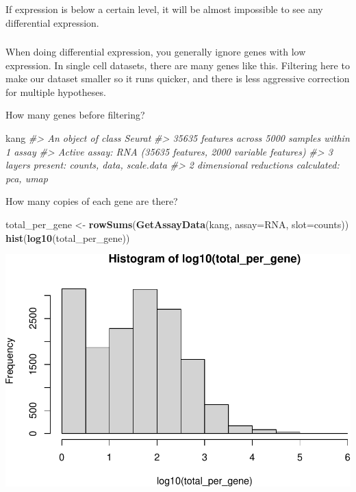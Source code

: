 \documentclass[
]{book}
\newenvironment{Shaded}{\begin{snugshade}}{\end{snugshade}}
\newcommand{\AttributeTok}[1]{\textcolor[rgb]{0.13,0.29,0.53}{#1}}
\newcommand{\CommentTok}[1]{\textcolor[rgb]{0.56,0.35,0.01}{\textit{#1}}}
\newcommand{\FunctionTok}[1]{\textcolor[rgb]{0.13,0.29,0.53}{\textbf{#1}}}
\newcommand{\NormalTok}[1]{#1}
\newcommand{\OtherTok}[1]{\textcolor[rgb]{0.56,0.35,0.01}{#1}}
\newcommand{\StringTok}[1]{\textcolor[rgb]{0.31,0.60,0.02}{#1}}
\begin{document}
If expression is below a certain level, it will be almost impossible to see any differential expression.

\hypertarget{section-11}{%
\subsubsection*{}\label{section-11}}

When doing differential expression, you generally ignore genes with low expression.
In single cell datasets, there are many genes like this. Filtering here to make our dataset smaller so it runs quicker, and there is less aggressive correction for multiple hypotheses.

How many genes before filtering?

\begin{Shaded}
\begin{Highlighting}[]
\NormalTok{kang}
\CommentTok{\#\textgreater{} An object of class Seurat }
\CommentTok{\#\textgreater{} 35635 features across 5000 samples within 1 assay }
\CommentTok{\#\textgreater{} Active assay: RNA (35635 features, 2000 variable features)}
\CommentTok{\#\textgreater{}  3 layers present: counts, data, scale.data}
\CommentTok{\#\textgreater{}  2 dimensional reductions calculated: pca, umap}
\end{Highlighting}
\end{Shaded}

How many copies of each gene are there?

\begin{Shaded}
\begin{Highlighting}[]
\NormalTok{total\_per\_gene }\OtherTok{\textless{}{-}} \FunctionTok{rowSums}\NormalTok{(}\FunctionTok{GetAssayData}\NormalTok{(kang, }\AttributeTok{assay=}\StringTok{\textquotesingle{}RNA\textquotesingle{}}\NormalTok{, }\AttributeTok{slot=}\StringTok{\textquotesingle{}counts\textquotesingle{}}\NormalTok{))}
\FunctionTok{hist}\NormalTok{(}\FunctionTok{log10}\NormalTok{(total\_per\_gene))}
\end{Highlighting}
\end{Shaded}

\includegraphics{scRNAseqInR_Doco_files/figure-latex/unnamed-chunk-48-1.pdf}
\end{document}
